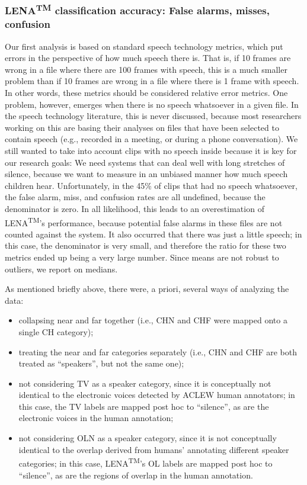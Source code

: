 \documentclass[english,floatsintext,man]{apa6}
\providecommand{\tightlist}{%
  \setlength{\itemsep}{0pt}\setlength{\parskip}{0pt}}
\begin{document}
\subsubsection{\texorpdfstring{LENA\textsuperscript{TM} classification
accuracy: False alarms, misses,
confusion}{LENATM classification accuracy: False alarms, misses, confusion}}\label{lenatm-classification-accuracy-false-alarms-misses-confusion}

Our first analysis is based on standard speech technology metrics, which
put errors in the perspective of how much speech there is. That is, if
10 frames are wrong in a file where there are 100 frames with speech,
this is a much smaller problem than if 10 frames are wrong in a file
where there is 1 frame with speech. In other words, these metrics should
be considered relative error metrics. One problem, however, emerges when
there is no speech whatsoever in a given file. In the speech technology
literature, this is never discussed, because most researchers working on
this are basing their analyses on files that have been selected to
contain speech (e.g., recorded in a meeting, or during a phone
conversation). We still wanted to take into account clips with no speech
inside because it is key for our research goals: We need systems that
can deal well with long stretches of silence, because we want to measure
in an unbiased manner how much speech children hear. Unfortunately, in
the 45\% of clips that had no speech whatsoever, the false alarm, miss,
and confusion rates are all undefined, because the denominator is zero.
In all likelihood, this leads to an overestimation of
LENA\textsuperscript{TM}'s performance, because potential false alarms
in these files are not counted against the system. It also occurred that
there was just a little speech; in this case, the denominator is very
small, and therefore the ratio for these two metrics ended up being a
very large number. Since means are not robust to outliers, we report on
medians.

As mentioned briefly above, there were, a priori, several ways of
analyzing the data:

\begin{itemize}
\tightlist
\item
  collapsing near and far together (i.e., CHN and CHF were mapped onto a
  single CH category);
\item
  treating the near and far categories separately (i.e., CHN and CHF are
  both treated as \enquote{speakers}, but not the same one);
\item
  not considering TV as a speaker category, since it is conceptually not
  identical to the electronic voices detected by ACLEW human annotators;
  in this case, the TV labels are mapped post hoc to \enquote{silence},
  as are the electronic voices in the human annotation;
\item
  not considering OLN as a speaker category, since it is not
  conceptually identical to the overlap derived from humans' annotating
  different speaker categories; in this case, LENA\textsuperscript{TM}'s
  OL labels are mapped post hoc to \enquote{silence}, as are the regions
  of overlap in the human annotation.
\end{itemize}
\end{document}
